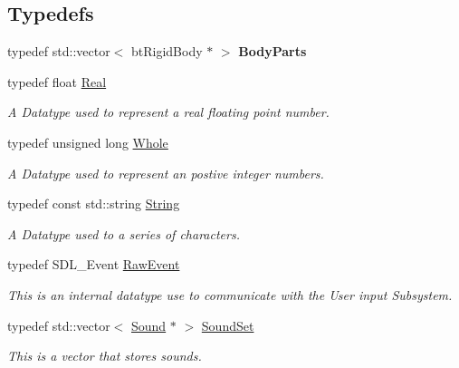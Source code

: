 \subsection*{Typedefs}
\begin{DoxyCompactItemize}
\item 
\hypertarget{namespacephys_a01fd36d2628fbe4b5366fa9086f114c5}{
typedef std::vector$<$ btRigidBody $\ast$ $>$ {\bfseries BodyParts}}
\label{df/dec/namespacephys_a01fd36d2628fbe4b5366fa9086f114c5}

\item 
typedef float \hyperlink{namespacephys_af7eb897198d265b8e868f45240230d5f}{Real}
\begin{DoxyCompactList}\small\item\em A Datatype used to represent a real floating point number. \item\end{DoxyCompactList}\item 
typedef unsigned long \hyperlink{namespacephys_a460f6bc24c8dd347b05e0366ae34f34a}{Whole}
\begin{DoxyCompactList}\small\item\em A Datatype used to represent an postive integer numbers. \item\end{DoxyCompactList}\item 
typedef const std::string \hyperlink{namespacephys_aa03900411993de7fbfec4789bc1d392e}{String}
\begin{DoxyCompactList}\small\item\em A Datatype used to a series of characters. \item\end{DoxyCompactList}\item 
typedef SDL\_\-Event \hyperlink{namespacephys_a8126d26e4507e66d09876988bb941fd4}{RawEvent}
\begin{DoxyCompactList}\small\item\em This is an internal datatype use to communicate with the User input Subsystem. \item\end{DoxyCompactList}\item 
typedef std::vector$<$ \hyperlink{classphys_1_1Sound}{Sound} $\ast$ $>$ \hyperlink{namespacephys_ab780c3162da5699fe421f3739ba03fc4}{SoundSet}
\begin{DoxyCompactList}\small\item\em This is a vector that stores sounds. \item\end{DoxyCompactList}\end{DoxyCompactItemize}


